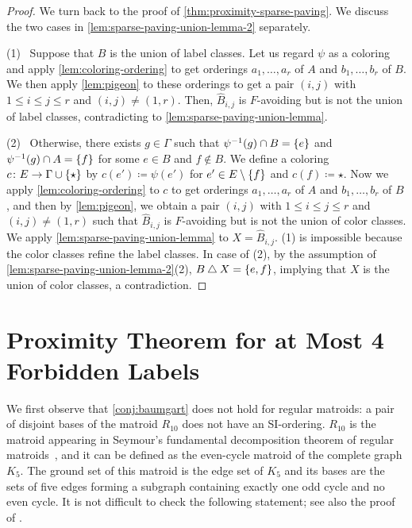 \documentclass{article}
\DeclarePairedDelimiter{\set}{\{}{\}}
\newcommand{\symdif}{\mathbin{\triangle}}
\theoremstyle{definition}
\begin{document}
\begin{proof}
We turn back to the proof of \cref{thm:proximity-sparse-paving}.
We discuss the two cases in \cref{lem:sparse-paving-union-lemma-2} separately.

\smallskip
(1)~
Suppose that $B$ is the union of label classes.
Let us regard $\psi$ as a coloring and apply \cref{lem:coloring-ordering} to get orderings $a_1, \dotsc, a_r$ of $A$ and $b_1, \dotsc, b_r$ of $B$.
We then apply \cref{lem:pigeon} to these orderings to get a pair $(i, j)$ with $1 \le i \le j \le r$ and $(i, j) \neq (1, r)$.
Then, $\hat{B}_{i,j}$ is $F$-avoiding but is not the union of label classes, contradicting to \cref{lem:sparse-paving-union-lemma}.

\smallskip
(2)~
Otherwise, there exists $g \in \Gamma$ such that $\psi^{-1}(g) \cap B = \set{e}$ and $\psi^{-1}(g) \cap A = \set{f}$ for some $e \in B$ and $f \notin B$.
We define a coloring $c\colon E \to \Gamma \cup \set{\star}$ by $c(e') \coloneqq \psi(e')$ for $e' \in E \setminus \set{f}$ and $c(f) \coloneqq \star$.
Now we apply \cref{lem:coloring-ordering} to $c$ to get orderings $a_1, \dotsc, a_r$ of $A$ and $b_1, \dotsc, b_r$ of $B$, and then by \cref{lem:pigeon}, we obtain a pair $(i, j)$ with $1 \le i \le j \le r$ and $(i, j) \neq (1, r)$ such that $\hat{B}_{i,j}$ is $F$-avoiding but is not the union of color classes.
We apply \cref{lem:sparse-paving-union-lemma} to $X = \hat{B}_{i,j}$.
(1) is impossible because the color classes refine the label classes.
In case of (2), by the assumption of \cref{lem:sparse-paving-union-lemma-2}(2), $B \symdif X = \set{e, f}$, implying that $X$ is the union of color classes, a contradiction.
\end{proof}



\section{Proximity Theorem for at Most 4 Forbidden Labels}\label{sec:four-forbidden}

We first observe that \cref{conj:baumgart} does not hold for regular matroids: a pair of disjoint bases of the matroid $R_{10}$ does not have an SI-ordering. 
$R_{10}$ is the matroid appearing in Seymour's fundamental decomposition theorem of regular matroids~\cite{seymour1980decomposition}, and it can be defined as the even-cycle matroid of the complete graph $K_5$.
The ground set of this matroid is the edge set of $K_5$ and its bases are the sets of five edges forming a subgraph containing exactly one odd cycle and no even cycle.
It is not difficult to check the following statement; see also the proof of \cite[Proposition~5.5]{berczi2023reconfiguration}.
\end{document}
